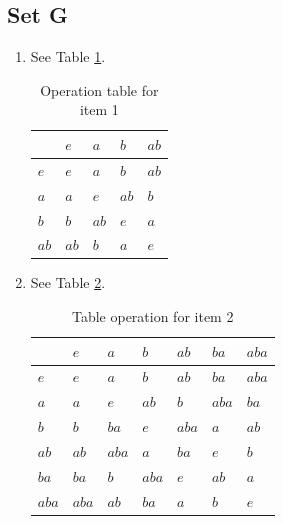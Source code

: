 \documentclass{article}
\begin{document}
\subsection{Set G}
\begin{enumerate}
    \item See Table \ref{tab:op-exercise-5G1}.
        \begin{table}[]
            \centering
            \begin{tabular}{l|llll}
            & $e$ & $a$ & $b$ & $ab$\\ \hline
            $e$ & $e$ & $a$ & $b$ & $ab$\\
            $a$ & $a$ & $e$ & $ab$& $b$ \\
            $b$ & $b$ & $ab$& $e$ & $a$ \\
            $ab$& $ab$& $b$ & $a$ & $e$
            \end{tabular}
            \caption{Operation table for item 1}
            \label{tab:op-exercise-5G1}
        \end{table}

    \item See Table \ref{tab:op-exercise-5G2}.
        \begin{table}[]
            \centering
            \begin{tabular}{l|llllll}
                & $e$  & $a$  & $b$  & $ab$ & $ba$ & $aba$ \\ \hline
            $e$  & $e$  & $a$  & $b$  & $ab$ & $ba$ & $aba$ \\
            $a$  & $a$  & $e$  & $ab$ & $b$  & $aba$ & $ba$ \\
            $b$  & $b$  & $ba$ & $e$  & $aba$ & $a$  & $ab$ \\
            $ab$ & $ab$ & $aba$ & $a$  & $ba$ & $e$  & $b$  \\
            $ba$ & $ba$ & $b$  & $aba$ & $e$  & $ab$ & $a$  \\
            $aba$ & $aba$ & $ab$ & $ba$ & $a$  & $b$  & $e$ 
            \end{tabular}
            \caption{Table operation for item 2}
            \label{tab:op-exercise-5G2}
        \end{table}


\end{enumerate}
\end{document}
